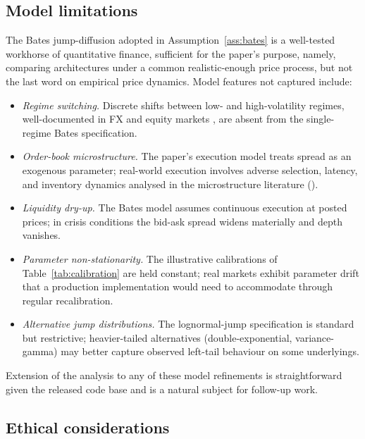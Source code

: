 \documentclass[preprint,12pt,authoryear]{elsarticle}
\theoremstyle{definition}
\begin{document}
\subsection{Model limitations}
\label{sec:disc-model}

The Bates jump-diffusion adopted in Assumption~\ref{ass:bates} is
a well-tested workhorse of quantitative finance, sufficient for
the paper's purpose, namely, comparing architectures under a
common realistic-enough price process, but not the last word
on empirical price dynamics. Model features not captured include:
\begin{itemize}
    \item \emph{Regime switching.} Discrete shifts between low-
    and high-volatility regimes, well-documented in FX and
    equity markets \citep{Hamilton1989}, are absent from the
    single-regime Bates specification.
    \item \emph{Order-book microstructure.} The paper's
    execution model treats spread as an exogenous parameter;
    real-world execution involves adverse selection, latency,
    and inventory dynamics analysed in the microstructure
    literature (\citealp{Kyle1985,GlostenMilgrom1985}).
    \item \emph{Liquidity dry-up.} The Bates model assumes
    continuous execution at posted prices; in crisis conditions
    the bid-ask spread widens materially and depth vanishes.
    \item \emph{Parameter non-stationarity.} The illustrative
    calibrations of Table~\ref{tab:calibration} are held
    constant; real markets exhibit parameter drift that a
    production implementation would need to accommodate
    through regular recalibration.
    \item \emph{Alternative jump distributions.} The
    lognormal-jump specification is standard but restrictive;
    heavier-tailed alternatives (double-exponential,
    variance-gamma) may better capture observed left-tail
    behaviour on some underlyings.
\end{itemize}
Extension of the analysis to any of these model refinements is
straightforward given the released code base and is a natural
subject for follow-up work.

\subsection{Ethical considerations}
\label{sec:disc-ethics}
\end{document}
